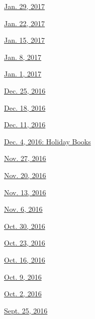 \href{http://www.nytimes.com/indexes/2017/01/29/todayspaper/index.html\#bookreview}{Jan.
29, 2017}

\href{http://www.nytimes.com/indexes/2017/01/22/todayspaper/index.html\#bookreview}{Jan.
22, 2017}

\href{http://www.nytimes.com/indexes/2017/01/15/todayspaper/index.html\#bookreview}{Jan.
15, 2017}

\href{http://www.nytimes.com/indexes/2017/01/08/todayspaper/index.html\#bookreview}{Jan.
8, 2017}

\href{http://www.nytimes.com/indexes/2017/01/01/todayspaper/index.html\#bookreview}{Jan.
1, 2017}

\href{http://www.nytimes.com/indexes/2016/12/25/todayspaper/index.html\#bookreview}{Dec.
25, 2016}

\href{http://www.nytimes.com/indexes/2016/12/18/todayspaper/index.html\#bookreview}{Dec.
18, 2016}

\href{http://www.nytimes.com/indexes/2016/12/11/todayspaper/index.html\#bookreview}{Dec.
11, 2016}

\href{http://www.nytimes.com/indexes/2016/12/11/todayspaper/index.html\#bookreview}{Dec.
4, 2016: Holiday Books}

\href{http://www.nytimes.com/indexes/2016/11/27/todayspaper/index.html\#bookreview}{Nov.
27, 2016}

\href{http://www.nytimes.com/indexes/2016/11/20/todayspaper/index.html\#bookreview}{Nov.
20, 2016}

\href{http://www.nytimes.com/indexes/2016/11/13/todayspaper/index.html\#bookreview}{Nov.
13, 2016}

\href{http://www.nytimes.com/indexes/2016/11/06/todayspaper/index.html\#bookreview}{Nov.
6, 2016}

\href{http://www.nytimes.com/indexes/2016/10/30/todayspaper/index.html\#bookreview}{Oct.
30, 2016}

\href{http://www.nytimes.com/indexes/2016/10/23/todayspaper/index.html\#bookreview}{Oct.
23, 2016}

\href{http://www.nytimes.com/indexes/2016/10/16/todayspaper/index.html\#bookreview}{Oct.
16, 2016}

\href{http://www.nytimes.com/indexes/2016/10/09/todayspaper/index.html\#bookreview}{Oct.
9, 2016}

\href{http://www.nytimes.com/indexes/2016/10/02/todayspaper/index.html\#bookreview}{Oct.
2, 2016}

\href{http://www.nytimes.com/indexes/2016/09/25/todayspaper/index.html\#bookreview}{Sept.
25, 2016}

